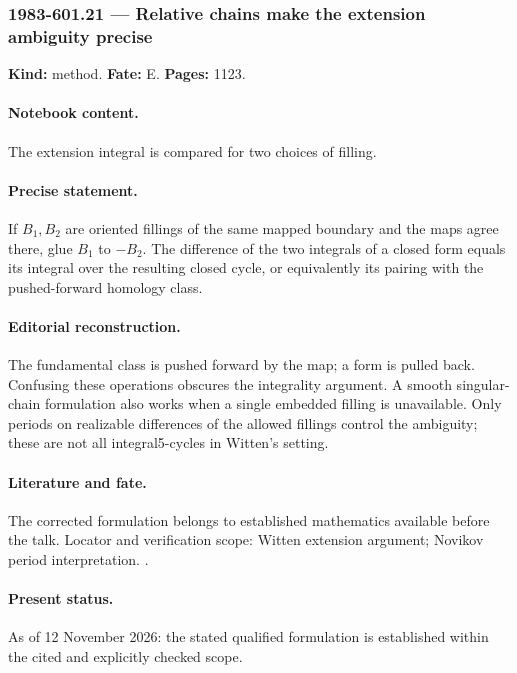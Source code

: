 \subsubsection{1983-601.21 --- Relative chains make the extension ambiguity precise}

\label{item:1983-601.21}

\noindent\textbf{Kind:} method. \textbf{Fate:} E. \textbf{Pages:} 1123.\par

\paragraph{Notebook content.} The extension integral is compared for two choices of filling.

\paragraph{Precise statement.} If \(B_1,B_2\) are oriented fillings of the same mapped boundary and the maps agree there, glue \(B_1\) to \(-B_2\). The difference of the two integrals of a closed form equals its integral over the resulting closed cycle, or equivalently its pairing with the pushed-forward homology class.

\paragraph{Editorial reconstruction.} The fundamental class is pushed forward by the map; a form is pulled back. Confusing these operations obscures the integrality argument. A smooth singular-chain formulation also works when a single embedded filling is unavailable. Only periods on realizable differences of the allowed fillings control the ambiguity; these are not all integral5-cycles in Witten's setting.

\paragraph{Literature and fate.} The corrected formulation belongs to established mathematics available before the talk. Locator and verification scope: Witten extension argument; Novikov period interpretation. \cite{witten1983current,novikov1982hamiltonian}.

\paragraph{Present status.} As of 12 November 2026: the stated qualified formulation is established within the cited and explicitly checked scope.

